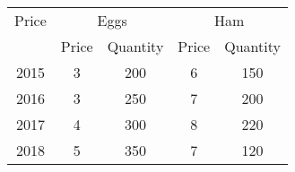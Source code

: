 \begin{table}[]
    \centering
    \begin{tabular}{ccccc}
    \hline
    Price & \multicolumn{2}{c}{Eggs} & \multicolumn{2}{c}{Ham}\\
         & Price & Quantity & Price & Quantity \\
    \hline
    2015 & 3 & 200 & 6 & 150 \\
    2016 & 3 & 250 & 7 & 200 \\
    2017 & 4 & 300 & 8 & 220 \\
    2018 & 5 & 350 & 7 & 120 \\
    \hline
    \end{tabular}
\end{table}